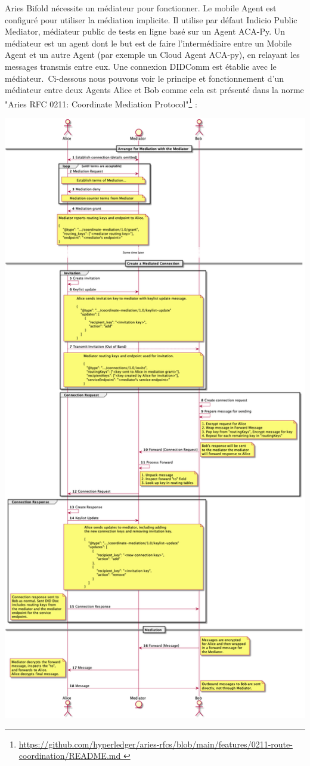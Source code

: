 \documentclass[12pt, openany]{report}
\begin{document}
\begin{flushleft}
\begin{itemize}
Aries Bifold nécessite un médiateur pour fonctionner. Le mobile Agent est configuré pour utiliser la médiation implicite. Il utilise par défaut Indicio Public Mediator, médiateur public de tests en ligne basé sur un Agent ACA-Py.
Un médiateur est un agent dont le but est de faire l'intermédiaire entre un Mobile Agent et un autre Agent (par exemple un Cloud Agent ACA-py), en relayant les messages transmis entre eux. Une connexion DIDComm est établie avec le médiateur.\
Ci-dessous nous pouvons voir le principe et fonctionnement d'un médiateur entre deux Agents Alice et Bob comme cela est présenté dans la norme "Aries RFC 0211: Coordinate Mediation Protocol"\footnote{\url{https://github.com/hyperledger/aries-rfcs/blob/main/features/0211-route-coordination/README.md
}} :\\

\begin{center}
\includegraphics[scale=0.25]{mediator.png}

\end{center}
\end{itemize}
\end{flushleft}
\end{document}
